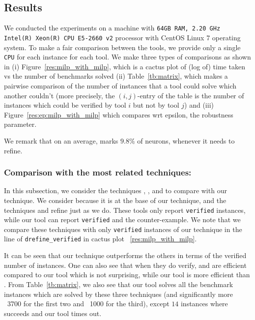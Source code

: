 \subsection{Results}
We conducted the experiments on a machine with \texttt{64GB RAM, 2.20 GHz Intel(R) Xeon(R) CPU E5-2660 v2}
processor with CentOS Linux 7 operating system. 
To make a fair comparison between the tools, we provide only a single \texttt{CPU} for each instance for each tool. 
We make three types of comparisons as shown in (i) Figure~\ref{res:milp_with_milp}, which is a cactus plot of (log of) time taken vs the number of benchmarks solved (ii) Table~\ref{tb:matrix}, which makes a pairwise comparison of the number of instances that a tool could solve which another couldn't  (more precisely, the $(i,j)$-entry of the table is the number of instances which could be verified by tool $i$ but not by tool $j$) and (iii) Figure~\ref{res:ep:milp_with_milp} which compares wrt epsilon, the robustness parameter.

We remark that on an average, \drefine{} marks $9.8\%$ of neurons, whenever it needs to refine.  

\subsubsection{Comparison with the most related techniques:}
In this subsection, we consider the techniques \deeppoly{}, \kpoly{}, and \deepsrgr{} to compare with our technique. 
We consider \deeppoly{} because it is at the base of our technique, and the techniques \kpoly{} and \deepsrgr{} refine \deeppoly{} just as we do. These tools only report \texttt{verified} instances, while our tool can report  \texttt{verified} and the counter-example. We note that we compare these techniques with only \texttt{verified}  instances of our technique in the line of \texttt{drefine\_verified} in cactus plot ~\ref{res:milp_with_milp}. 

It can be seen that our technique outperforms the others in terms of the verified number of instances. One can also see that when they do verify, \deeppoly{} and \kpoly{} are efficient compared to our tool which is not surprising, while our tool is more efficient than \deepsrgr{}. From Table~\ref{tb:matrix}, we also see  that our tool solves all the benchmark instances which are solved by these three techniques (and significantly more ~3700 for the first two and ~1000 for the third), except $14$ instances where \kpoly{} succeeds and our tool times out.


